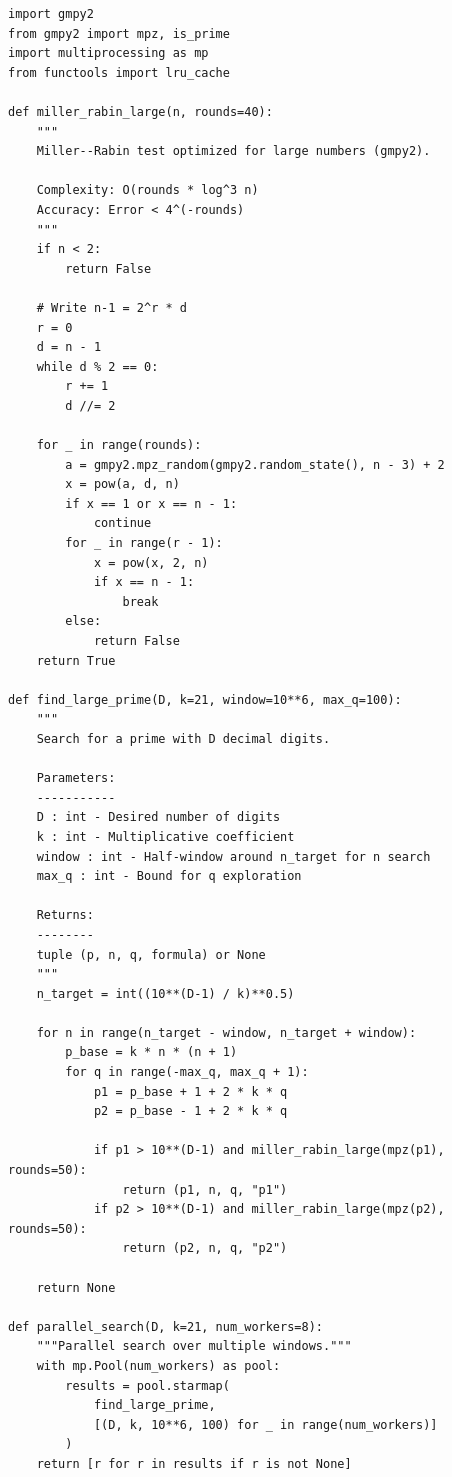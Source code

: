 \documentclass[11pt,a4paper]{article}
\theoremstyle{definition}
\theoremstyle{plain}
\begin{document}
\begin{lstlisting}[caption={Large prime search}]
import gmpy2
from gmpy2 import mpz, is_prime
import multiprocessing as mp
from functools import lru_cache

def miller_rabin_large(n, rounds=40):
    """
    Miller--Rabin test optimized for large numbers (gmpy2).
    
    Complexity: O(rounds * log^3 n)
    Accuracy: Error < 4^(-rounds)
    """
    if n < 2:
        return False
    
    # Write n-1 = 2^r * d
    r = 0
    d = n - 1
    while d % 2 == 0:
        r += 1
        d //= 2
    
    for _ in range(rounds):
        a = gmpy2.mpz_random(gmpy2.random_state(), n - 3) + 2
        x = pow(a, d, n)
        if x == 1 or x == n - 1:
            continue
        for _ in range(r - 1):
            x = pow(x, 2, n)
            if x == n - 1:
                break
        else:
            return False
    return True

def find_large_prime(D, k=21, window=10**6, max_q=100):
    """
    Search for a prime with D decimal digits.
    
    Parameters:
    -----------
    D : int - Desired number of digits
    k : int - Multiplicative coefficient
    window : int - Half-window around n_target for n search
    max_q : int - Bound for q exploration
    
    Returns:
    --------
    tuple (p, n, q, formula) or None
    """
    n_target = int((10**(D-1) / k)**0.5)
    
    for n in range(n_target - window, n_target + window):
        p_base = k * n * (n + 1)
        for q in range(-max_q, max_q + 1):
            p1 = p_base + 1 + 2 * k * q
            p2 = p_base - 1 + 2 * k * q
            
            if p1 > 10**(D-1) and miller_rabin_large(mpz(p1), rounds=50):
                return (p1, n, q, "p1")
            if p2 > 10**(D-1) and miller_rabin_large(mpz(p2), rounds=50):
                return (p2, n, q, "p2")
    
    return None

def parallel_search(D, k=21, num_workers=8):
    """Parallel search over multiple windows."""
    with mp.Pool(num_workers) as pool:
        results = pool.starmap(
            find_large_prime, 
            [(D, k, 10**6, 100) for _ in range(num_workers)]
        )
    return [r for r in results if r is not None]
\end{lstlisting}
\end{document}
